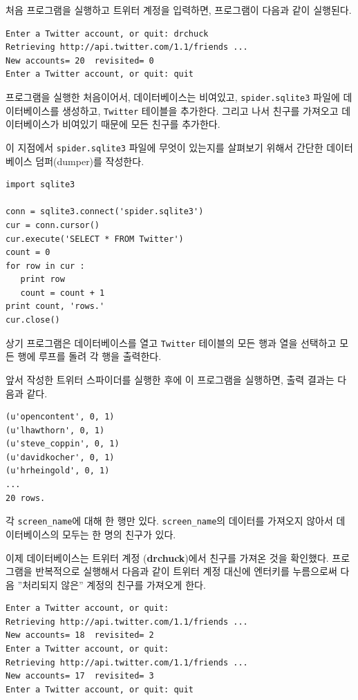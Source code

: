처음 프로그램을 실행하고 트위터 계정을 입력하면, 프로그램이 다음과 같이 실행된다.

\beforeverb
\begin{verbatim}
Enter a Twitter account, or quit: drchuck
Retrieving http://api.twitter.com/1.1/friends ...
New accounts= 20  revisited= 0
Enter a Twitter account, or quit: quit
\end{verbatim}
\afterverb
%

프로그램을 실행한 처음이어서, 데이터베이스는 비여있고, 
{\tt spider.sqlite3} 파일에 데이터베이스를 생성하고, {\tt Twitter} 테이블을 추가한다.
그리고 나서 친구를 가져오고 데이터베이스가 비여있기 때문에 모든 친구를 추가한다.

이 지점에서 {\tt spider.sqlite3} 파일에 무엇이 있는지를 살펴보기 위해서 간단한 데이터베이스 덤퍼(dumper)를 작성한다.

\beforeverb
\begin{verbatim}
import sqlite3

conn = sqlite3.connect('spider.sqlite3')
cur = conn.cursor()
cur.execute('SELECT * FROM Twitter')
count = 0
for row in cur :
   print row
   count = count + 1
print count, 'rows.'
cur.close()
\end{verbatim}
\afterverb
%

상기 프로그램은 데이터베이스를 열고 {\tt Twitter} 테이블의 모든 행과 열을 선택하고 
모든 행에 루프를 돌려 각 행을 출력한다.

앞서 작성한 트위터 스파이더를 실행한 후에 이 프로그램을 실행하면, 출력 결과는 다음과 같다.

\beforeverb
\begin{verbatim}
(u'opencontent', 0, 1)
(u'lhawthorn', 0, 1)
(u'steve_coppin', 0, 1)
(u'davidkocher', 0, 1)
(u'hrheingold', 0, 1)
...
20 rows.
\end{verbatim}
\afterverb
%

각 \verb"screen_name"에 대해 한 행만 있다. \verb"screen_name"의 데이터를 가져오지 않아서 데이터베이스의 모두는 한 명의 친구가 있다. 

이제 데이터베이스는 트위터 계정 ({\bf drchuck})에서 친구를 가져온 것을 확인했다.
프로그램을 반복적으로 실행해서 
다음과 같이 트위터 계정 대신에 엔터키를 누름으로써 다음 ''처리되지 않은'' 계정의 친구를 가져오게 한다.

\beforeverb
\begin{verbatim}
Enter a Twitter account, or quit: 
Retrieving http://api.twitter.com/1.1/friends ...
New accounts= 18  revisited= 2
Enter a Twitter account, or quit: 
Retrieving http://api.twitter.com/1.1/friends ...
New accounts= 17  revisited= 3
Enter a Twitter account, or quit: quit
\end{verbatim}
\afterverb
%

